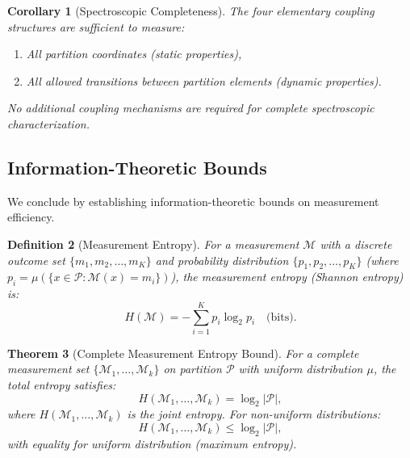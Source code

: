 \documentclass[twocolumn,10pt,a4paper]{article}
\newtheorem{theorem}{Theorem}[section]
\newtheorem{corollary}[theorem]{Corollary}
\newtheorem{definition}[theorem]{Definition}
\theoremstyle{remark}
\newcommand{\partition}{\mathcal{P}}
\begin{document}
\begin{corollary}[Spectroscopic Completeness]
\label{cor:spectroscopic_completeness_full}
The four elementary coupling structures are sufficient to measure:
\begin{enumerate}[label=(\roman*), noitemsep]
    \item All partition coordinates (static properties),
    \item All allowed transitions between partition elements (dynamic properties).
\end{enumerate}
No additional coupling mechanisms are required for complete spectroscopic characterization.
\end{corollary}

\subsection{Information-Theoretic Bounds}

We conclude by establishing information-theoretic bounds on measurement efficiency.

\begin{definition}[Measurement Entropy]
\label{def:measurement_entropy}
For a measurement $\mathcal{M}$ with a discrete outcome set $\{m_1, m_2, \ldots, m_K\}$ and probability distribution $\{p_1, p_2, \ldots, p_K\}$ (where $p_i = \mu(\{x \in \partition : \mathcal{M}(x) = m_i\})$), the \emph{measurement entropy} (Shannon entropy) is:
\begin{equation}
H(\mathcal{M}) = -\sum_{i=1}^K p_i \log_2 p_i \quad \text{(bits)}.
\end{equation}
\end{definition}

\begin{theorem}[Complete Measurement Entropy Bound]
\label{thm:complete_entropy}
For a complete measurement set $\{\mathcal{M}_1, \ldots, \mathcal{M}_k\}$ on partition $\partition$ with uniform distribution $\mu$, the total entropy satisfies:
\begin{equation}
H(\mathcal{M}_1, \ldots, \mathcal{M}_k) = \log_2 |\partition|,
\end{equation}
where $H(\mathcal{M}_1, \ldots, \mathcal{M}_k)$ is the joint entropy. For non-uniform distributions:
\begin{equation}
H(\mathcal{M}_1, \ldots, \mathcal{M}_k) \leq \log_2 |\partition|,
\end{equation}
with equality for uniform distribution (maximum entropy).
\end{theorem}
\end{document}
